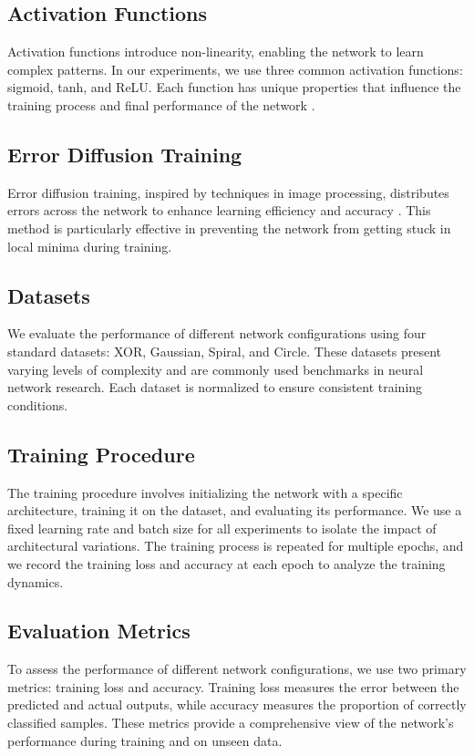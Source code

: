 \documentclass{article} %
\begin{document}
\subsection{Activation Functions}
Activation functions introduce non-linearity, enabling the network to learn complex patterns. In our experiments, we use three common activation functions: sigmoid, tanh, and ReLU. Each function has unique properties that influence the training process and final performance of the network \citep{goodfellow2016deep}.

\subsection{Error Diffusion Training}
Error diffusion training, inspired by techniques in image processing, distributes errors across the network to enhance learning efficiency and accuracy \citep{journ2023hebbian}. This method is particularly effective in preventing the network from getting stuck in local minima during training.

\subsection{Datasets}
We evaluate the performance of different network configurations using four standard datasets: XOR, Gaussian, Spiral, and Circle. These datasets present varying levels of complexity and are commonly used benchmarks in neural network research. Each dataset is normalized to ensure consistent training conditions.

\subsection{Training Procedure}
The training procedure involves initializing the network with a specific architecture, training it on the dataset, and evaluating its performance. We use a fixed learning rate and batch size for all experiments to isolate the impact of architectural variations. The training process is repeated for multiple epochs, and we record the training loss and accuracy at each epoch to analyze the training dynamics.

\subsection{Evaluation Metrics}
To assess the performance of different network configurations, we use two primary metrics: training loss and accuracy. Training loss measures the error between the predicted and actual outputs, while accuracy measures the proportion of correctly classified samples. These metrics provide a comprehensive view of the network's performance during training and on unseen data.
\end{document}
